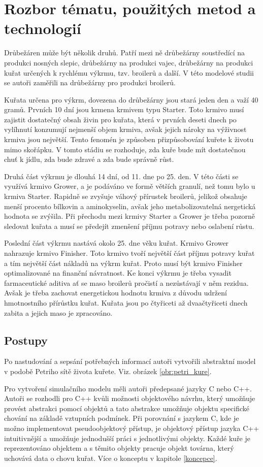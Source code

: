\documentclass[a4paper,10pt]{article}
\begin{document}
%
%

\section{Rozbor tématu, použitých metod a technologií}\label{rozbor}
Drůbežáren může být několik druhů. Patří mezi ně drůbežárny soustředící 
na produkci nosných slepic, drůbežárny na produkci vajec, drůbežárny 
na produkci kuřat určených k rychlému výkrmu, tzv. broilerů a další.
V této modelové studii se autoři zaměřili na drůbežárny pro produkci broilerů.
\par
Kuřata určena pro výkrm, dovezena do drůbežárny jsou stará jeden den 
a važí 40 gramů. Prvních 10 dní jsou krmena krmivem typu Starter. Toto krmivo 
musí zajistit dostatečný obsah živin pro kuřata, která v prvních deseti dnech
po vylíhnutí konzumují nejmenší objem krmiva, avšak jejich nároky na výživnost krmiva
jsou největší. Tento fenomén je způsoben přizpůsobování kuřete k životu mimo skořápku.
V tomto stádiu se rozhoduje, zda kuře bude mít dostatečnou chuť k jídlu, zda bude zdravé
a zda bude správně růst.
\par
Druhá část výkrmu je dlouhá 14 dní, od 11. dne po 25. den. V této části se využívá krmivo
Grower, a je podáváno ve formě větších granulí, než tomu bylo u krmiva Starter.
Rapidně se zvyšuje váhový přírustek broilerů, jelikož obsahuje menší procento bílkovin
a aminokyselin, avšak jeho metabolizovatelná nergetická hodnota se zvýšila. Při přechodu
mezi krmivy Starter a Grower je třeba pozorně sledovat kuřata a musí se předejít zmenšení
příjmu potravy nebo oslabení růstu.
\par
Poslední část výkrmu nastává okolo 25. dne věku kuřat. Krmivo Grower nahrazuje krmivo Finisher.
Toto krmivo tvoří největší část příjmu potravy kuřat a tím největší část nákladů na výkrm kuřat.
Proto musí být krmivo Finisher optimalizované na finanční návratnost. Ke konci výkrmu
je třeba vysadit farmaceutické aditiva ať se maso broilerů pročistí 
a nezůstávají v něm rezidua. Avšak je třeba zachovat energetickou hodnotu krmiva z důvodu
udržení hmotnostního přírůstku kuřat. Kuřata jsou po čtyřiceti až dvaačtyřiceti dnech zabita
a jejich maso je zpracováno.

\subsection{Postupy}\label{postupy}
Po nastudování a sepsání potřebných informací autoři vytvořili abstraktní model v podobě
Petriho sítě\cite{petriho_sit} života kuřete. Viz. obrázek \ref{obr:petri_kure}.
\par
Pro vytvoření simulačního modelu měli autoři předepsané jazyky C nebo C++. Autoři se rozhodli
pro C++ kvůli možnosti objektového návrhu, který umožňuje provést abstrakci pomocí objektů
a tato abstrakce umožňuje objektu specifické chování na základě vztupních podmínek.
Při porovnání s jazykem C, kde je možno implementovat pseudoobjektový přístup, je objektový 
přístup jazyka C++ intuitivnější a umožňuje jednodušší práci s jednotlivými objekty.
Každé kuře je reprezentováno objektem a s těmito objekty pracuje objekt továrna, který uchovává
data o chovu kuřat. Více o konceptu v kapitole \ref{koncepce}.
\end{document}
